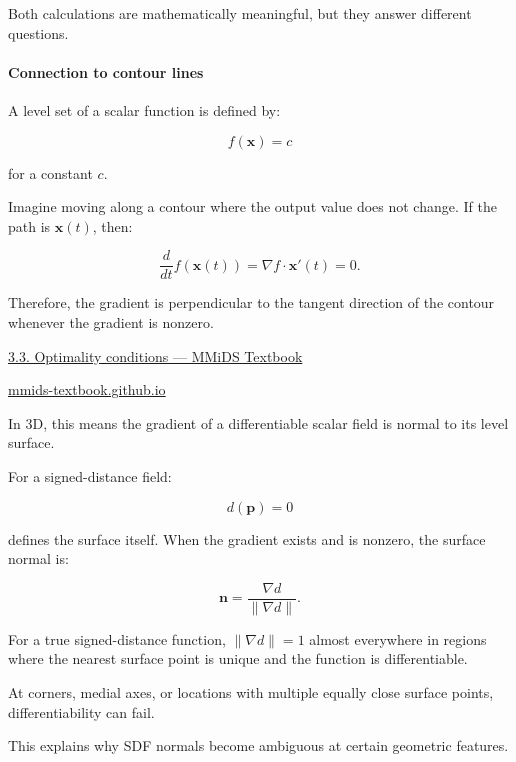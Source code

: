Both calculations are mathematically meaningful, but they answer different questions.

\paragraph{Connection to contour lines}\label{02-foundations-ii-ch021-connection-to-contour-lines}

\hypertarget{02-foundations-ii-ch021-connection-to-contour-lines}{}

A level set of a scalar function is defined by:

\[
f(\mathbf x)=c
\]

for a constant \(c\).

Imagine moving along a contour where the output value does not change. If the path is \(\mathbf x(t)\), then:

\[
\frac d{dt}f(\mathbf x(t)) = \nabla f\cdot\mathbf x'(t)=0.
\]

Therefore, the gradient is perpendicular to the tangent direction of the contour whenever the gradient is nonzero.

\href{https://images.openai.com/static-rsc-4/v46Mm5YWBYnLwLfo1X8evI0zsZ6KQblMrBzNblf8TQLA-sQyDBWZ0mUgOBYe8xGNst9diAopOVwwDJp922HzIS0Wu6TtpLFzxPZjmFnZNX6_cmlh-XAHYLSntx-FivIjSE9LquhxX5wmwLGMb6B8x-zvsRNbuOiNaWWc-qQe2bE?purpose=inline}{3.3. Optimality conditions --- MMiDS Textbook}

\href{https://mmids-textbook.github.io/chap03_opt/03_optimality/roch-mmids-opt-optimality.html?utm_source=chatgpt.com}{mmids-textbook.github.io}

In 3D, this means the gradient of a differentiable scalar field is normal to its level surface.

For a signed-distance field:

\[
d(\mathbf p)=0
\]

defines the surface itself. When the gradient exists and is nonzero, the surface normal is:

\[
\mathbf n= \frac{\nabla d}{\|\nabla d\|}.
\]

For a true signed-distance function, \(\|\nabla d\|=1\) almost everywhere in regions where the nearest surface point is unique and the function is differentiable.

At corners, medial axes, or locations with multiple equally close surface points, differentiability can fail.

This explains why SDF normals become ambiguous at certain geometric features.

